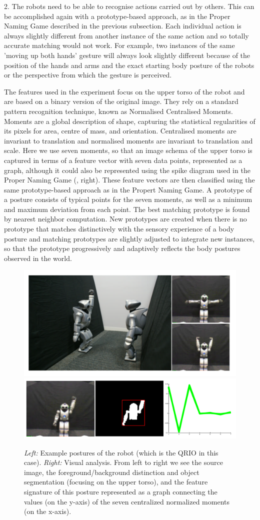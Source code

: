 2. The robots need to be able to recognise actions carried out by others. This can be accomplished again 
with a prototype-based approach, as in the Proper Naming Game described in the previous subsection. Each individual action 
is always slightly different from another instance of the same action and so totally accurate matching would not work. 
For example, two instances of the same 'moving up both hands' gesture will always look slightly different because of the 
position of the hands and arms and the exact starting body posture of the robots or the perspective from which 
the gesture is perceived. 

The features used in the experiment focus on the upper torso of the robot and are based on a binary 
version of the original image. They rely on a standard pattern recognition technique, known as Normalised 
Centralised Moments.\cite{Hu:1962} 
Moments are a global description of shape, capturing the statistical regularities
of its pixels for area, centre of mass, and orientation. Centralised moments are invariant to translation and 
normalised moments are invariant to translation and scale. Here we use seven moments, so that an image schema of 
the upper torso is captured in terms of a feature vector with seven data points, represented as a graph, 
although it could also be represented using the spike diagram used in the Proper Naming Game (, right). 
These feature vectors are then classified using the same prototype-based approach as in the Propert Naming Game. A prototype of a posture 
consists of typical points for the seven moments, as well as a minimum and maximum deviation from 
each point. The best matching prototype is found by nearest neighbor computation. New prototypes are created 
when there is no prototype that matches distinctively with the sensory experience of a body posture and matching prototypes are
slightly adjusted to integrate new instances, so that the prototype progressively and adaptively reflects the body postures observed
in the world. 

\begin{figure}
\centerline{\includegraphics[width=0.2\linewidth]{chap11/figs/postures.pdf}\includegraphics[width=0.75\linewidth]{chap11/figs/vision_2.pdf}}
\caption{\label{vision} \footnotesize{{\it Left:} Example postures of the robot (which is the QRIO in this case).
{\it Right:} Visual analysis. From left to right we see the source image, the foreground/background distinction and object segmentation (focusing on the upper torso), and the feature signature of this posture represented as a graph connecting the values (on the y-axis)
of the seven centralized normalized moments (on the x-axis).}}
\end{figure}

